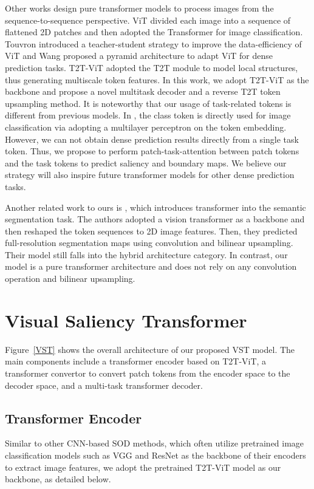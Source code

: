 \documentclass[10pt,twocolumn,letterpaper]{article}
\begin{document}
Other works design pure transformer models to process images from the sequence-to-sequence perspective. ViT \cite{dosovitskiy2020image} divided each image into a sequence of flattened 2D patches and then adopted the Transformer for image classification.
Touvron \etal \cite{touvron2020training} introduced a teacher-student strategy 
to improve the data-efficiency of ViT and Wang \etal \cite{wang2021pvt} proposed a pyramid architecture to adapt ViT for dense prediction tasks.
T2T-ViT \cite{yuan2021tokens} adopted the T2T module to model local structures, thus generating multiscale token features.
In this work, we adopt T2T-ViT as the backbone and propose a novel multitask decoder and a reverse T2T token upsampling method. It is noteworthy that our usage of task-related tokens is different from previous models. 
In \cite{dosovitskiy2020image,touvron2020training}, the class token is directly used for image classification via adopting a multilayer perceptron on the token embedding. 
However, 
we can not obtain dense prediction results directly from a single task token. Thus, we propose to perform patch-task-attention between patch tokens and the task tokens to predict saliency and boundary maps. We believe our strategy will also inspire future transformer models for other dense prediction tasks.

Another related work to ours is \cite{zheng2020rethinking}, which introduces transformer into the semantic segmentation task.
The authors adopted a vision transformer as a backbone and then reshaped the token sequences to 2D image features.
Then, they predicted full-resolution segmentation maps using convolution and bilinear upsampling. 
Their model still falls into the hybrid architecture category. In contrast, our model is a pure transformer architecture and does not rely on any convolution operation and bilinear upsampling.

\section{Visual Saliency Transformer}
Figure~\ref{VST} shows the overall architecture of our proposed VST model.
The main components include a transformer encoder based on T2T-ViT, a transformer convertor to convert patch tokens from the encoder space to the decoder space, and a multi-task transformer decoder.

\subsection{Transformer Encoder}
Similar to other CNN-based SOD methods, which often utilize pretrained image classification models such as VGG \cite{simonyan2014vgg} and ResNet \cite{he2016resnet} as the backbone of their encoders to extract image features, we adopt the pretrained T2T-ViT \cite{yuan2021tokens} model as our backbone, as detailed below.
\end{document}
